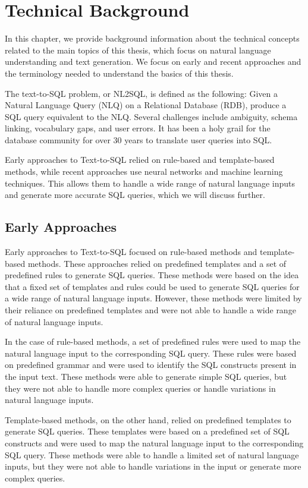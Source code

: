 \section{Technical Background}

In this chapter, we provide background information about the technical concepts related to the main topics of this thesis, which focus on natural language understanding and text generation. We focus on early and recent approaches and the terminology needed to understand the basics of this thesis.

The text-to-SQL problem, or NL2SQL, is defined as the following: Given a Natural Language Query (NLQ) on a Relational Database (RDB), produce a SQL query equivalent to the NLQ. Several challenges include ambiguity, schema linking, vocabulary gaps, and user errors. It has been a holy grail for the database community for over 30 years to translate user queries into SQL.

Early approaches to Text-to-SQL relied on rule-based and template-based methods, while recent approaches use neural networks and machine learning techniques. This allows them to handle a wide range of natural language inputs and generate more accurate SQL queries, which we will discuss further.

\subsection{Early Approaches}

Early approaches to Text-to-SQL focused on rule-based methods and template-based methods. These approaches relied on predefined templates and a set of predefined rules to generate SQL queries. These methods were based on the idea that a fixed set of templates and rules could be used to generate SQL queries for a wide range of natural language inputs. However, these methods were limited by their reliance on predefined templates and were not able to handle a wide range of natural language inputs.

In the case of rule-based methods, a set of predefined rules were used to map the natural language input to the corresponding SQL query. These rules were based on predefined grammar and were used to identify the SQL constructs present in the input text. These methods were able to generate simple SQL queries, but they were not able to handle more complex queries or handle variations in natural language inputs.

Template-based methods, on the other hand, relied on predefined templates to generate SQL queries. These templates were based on a predefined set of SQL constructs and were used to map the natural language input to the corresponding SQL query. These methods were able to handle a limited set of natural language inputs, but they were not able to handle variations in the input or generate more complex queries.

